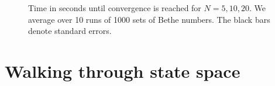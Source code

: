 \documentclass[11pt, a4paper]{report} %
\begin{document}
\begin{figure}[ph]
  \centering
  \\
  \\
  \caption{Time in seconds until convergence is reached for \(N=5,10,20\). We average over 10 runs of 1000 sets of Bethe numbers. The black bars denote standard errors.}
  \label{fig:convtimes}
\end{figure}

\section{Walking through state space}
\end{document}
